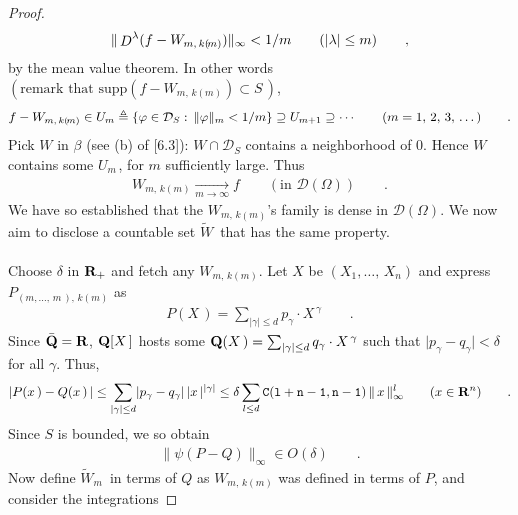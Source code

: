 \begin{proof}
%
\begin{align}\label{6_1_7}
  \|\deriv[\lambda] (f -W_{m,\, k(\!m)} ) \|_\infty < 1/m \qquad ( \lvert \lambda \rvert \leq m )\qquad ,
\end{align}
%
by the mean value theorem. In other words $(\text{remark that }\text{supp} (f -W_{m,\, k(\!m)}) \subset S\,)$,
%
\begin{align}\label{6_1_8}
  f- W_{m,\, k(\!m)} \in U_m \triangleq \{ \varphi \in \mathcal{D}_S :\, \| \varphi \|_m< 1/m \}
    \supseteq U_{m+1}\supseteq \dotsb \qquad( m=1,\, 2,\, 3,\, \dots) \qquad .
\end{align}
%
Pick $W$ in $\beta$ (see (b) of [6.3]): $W\cap\mathcal{D}_S$ contains a neighborhood of $0$. Hence $W$ contains some %
$U_{m\,}$, for $m$ sufficiently large. Thus
%
\begin{align}\label{6_1_9}
  W_{m,\, k(\!m) } \underset{m\to\infty}{\longrightarrow} f \qquad (\text{in } \mathcal{D}(\Omega))\qquad .
\end{align}
%
We have so established that the $W_{m,\, k(\!m)}$'s family is dense in $\mathcal{D}(\Omega)$. We now aim to disclose a %
countable set $\tilde{W}\,$ that has the same property. \\
\\
Choose $\delta $ in $\mathbf{R}_+$ and fetch any $W_{m,\, k(\!m)}$. Let $X$ be $(X_1,\dotsc,\, X_n)$ and express %
$P_{(m,\dotsc,\, m\,),\, k(\!m)}$ as
%
\begin{align}\label{6_1_10}
  P(X\,)=\sum_{\lvert \gamma \rvert \leq d} p_\gamma \cdot X^{\,\gamma} \qquad .
\end{align}
%
Since $\bar{\mathbf{Q}}=\mathbf{R}$, $\mathbf{Q}[X\,]$ hosts some ${\mathbf{Q}(X\,)=\sum_{\lvert \gamma \rvert \leq d} q_\gamma \cdot X^{\,\gamma}}$ such %
that $\lvert p_\gamma - q_\gamma\rvert < \delta\,$ for all $\gamma$. Thus,
%
\begin{align}\label{6_1_11}
  \lvert P(x\,)-Q(x\,) \,\rvert \leq \sum_{\lvert \gamma \rvert \leq d} \lvert p_\gamma-q_\gamma\rvert\,
    \lvert x\,\rvert^{\lvert \gamma\rvert} \leq \delta \sum_{l \leq d} \mathtt{C(l+n-1, n-1)}\, \| \, x\, \|^{l}_\infty
    \qquad (x\in \mathbf{R}^n)\qquad .
\end{align}
%
Since $S$ is bounded, we so obtain
%
\begin{align}\label{6_1_12}
  \|\psi (P- Q) \|_\infty \in O(\delta) \qquad .
\end{align}
%
Now define $\tilde{W}_m\,$ in terms of $Q$ as $W_{m,\, k(\!m)}$ was defined in terms of $P$, and consider the integrations %

\end{proof}

